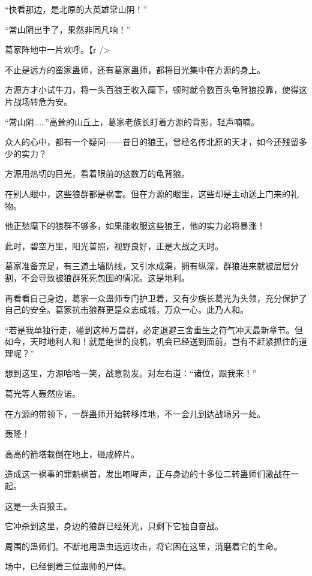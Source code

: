 
\begin{this_body}

“快看那边，是北原的大英雄常山阴！”

“常山阴出手了，果然非同凡响！”

葛家阵地中一片欢呼。【r />

不止是远方的蛮家蛊师，还有葛家蛊师，都将目光集中在方源的身上。

方源方才小试牛刀，将一头百狼王收入麾下，顿时就令数百头龟背狼投靠，使得这片战场转危为安。

“常山阴……”高耸的山丘上，葛家老族长盯着方源的背影，轻声喃喃。

众人的心中，都有一个疑问――昔日的狼王，曾经名传北原的天才，如今还残留多少的实力？

方源用热切的目光，看着眼前的这数万的龟背狼。

在别人眼中，这些狼群都是祸害。但在方源的眼里，这些却是主动送上门来的礼物。

他正愁麾下的狼群不够多，如果能收服这些狼王，他的实力必将暴涨！

此时，碧空万里，阳光普照，视野良好，正是大战之天时。

葛家准备充足，有三道土墙防线，又引水成渠，拥有纵深，群狼进来就被层层分割，不会导致被狼群死死包围的情况。这是地利。

再看看自己身边，葛家一众蛊师专门护卫着，又有少族长葛光为头领，充分保护了自己的安全。葛家抗击狼群更是众志成城，万众一心。此乃人和。

“若是我单独行走，碰到这种万兽群，必定退避三舍重生之符气冲天最新章节。但如今，天时地利人和！就是绝世的良机，机会已经送到面前，岂有不赶紧抓住的道理呢？”

想到这里，方源哈哈一笑，战意勃发。对左右道：“诸位，跟我来！”

葛光等人轰然应诺。

在方源的带领下，一群蛊师开始转移阵地，不一会儿到达战场另一处。

轰隆！

高高的箭塔栽倒在地上，砸成碎片。

造成这一祸事的罪魁祸首，发出咆哮声，正与身边的十多位二转蛊师们激战在一起。

这是一头百狼王。

它冲杀到这里，身边的狼群已经死光，只剩下它独自奋战。

周围的蛊师们。不断地用蛊虫远远攻击，将它困在这里，消磨着它的生命。

场中，已经倒着三位蛊师的尸体。


\end{this_body}
